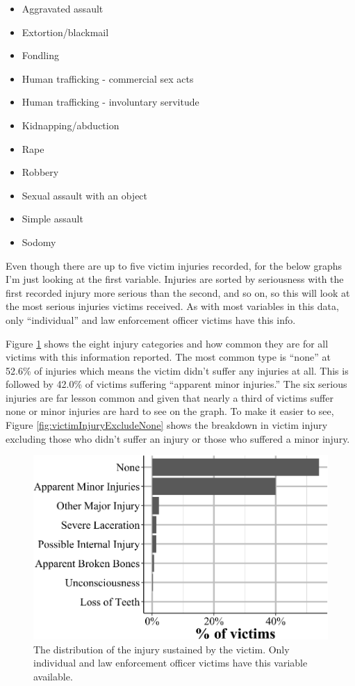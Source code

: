 \documentclass[
  12pt,
  openany]{book}
\providecommand{\tightlist}{%
  \setlength{\itemsep}{0pt}\setlength{\parskip}{0pt}}
\begin{document}
\begin{itemize}
\tightlist
\item
  Aggravated assault
\item
  Extortion/blackmail
\item
  Fondling
\item
  Human trafficking - commercial sex acts
\item
  Human trafficking - involuntary servitude
\item
  Kidnapping/abduction
\item
  Rape
\item
  Robbery
\item
  Sexual assault with an object
\item
  Simple assault
\item
  Sodomy
\end{itemize}

Even though there are up to five victim injuries recorded, for the below graphs I'm just looking at the first variable. Injuries are sorted by seriousness with the first recorded injury more serious than the second, and so on, so this will look at the most serious injuries victims received. As with most variables in this data, only ``individual'' and law enforcement officer victims have this info.

Figure \ref{fig:victimInjury} shows the eight injury categories and how common they are for all victims with this information reported. The most common type is ``none'' at 52.6\% of injuries which means the victim didn't suffer any injuries at all. This is followed by 42.0\% of victims suffering ``apparent minor injuries.'' The six serious injuries are far lesson common and given that nearly a third of victims suffer none or minor injuries are hard to see on the graph. To make it easier to see, Figure \ref{fig:victimInjuryExcludeNone} shows the breakdown in victim injury excluding those who didn't suffer an injury or those who suffered a minor injury.

\begin{figure}

{\centering \includegraphics[width=0.9\linewidth]{15_nibrs_victim_files/figure-latex/victimInjury-1} 

}

\caption{The distribution of the injury sustained by the victim. Only individual and law enforcement officer victims have this variable available.}\label{fig:victimInjury}
\end{figure}
\end{document}
